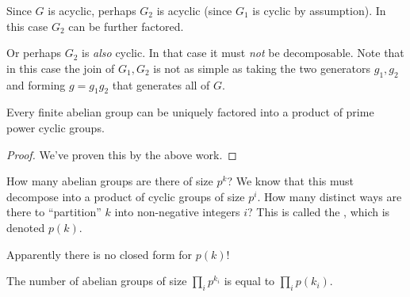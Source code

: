 \documentclass[11pt, oneside]{amsart}
\begin{document}
\begin{remark}
  Since $G$ is acyclic, perhaps $G_2$ is acyclic (since $G_1$ is cyclic
  by assumption). In this case $G_2$ can be further factored.

  Or perhaps $G_2$ is \emph{also} cyclic. In that case it must
  \emph{not} be decomposable. Note that in this case the join of $G_1,
  G_2$ is not as simple as taking the two generators $g_1, g_2$ and
  forming $g = g_1 g_2$ that generates all of $G$.
\end{remark}

\begin{theorem}

  Every finite abelian group can be uniquely factored into a product of
  prime power cyclic groups.
\end{theorem}

\begin{proof}
  We've proven this by the above work.
\end{proof}

\begin{remark}
  How many abelian groups are there of size $p^k$? We know that this
  must decompose into a product of cyclic groups of size $p^i$. How many
  distinct ways are there to ``partition'' $k$ into non-negative
  integers $i$? This is called the , which is
  denoted $p(k)$.

  Apparently there is no closed form for $p(k)$!
\end{remark}

\begin{remark}
  The number of abelian groups of size $\prod_i p^{k_i}$ is equal to
  $\prod_i p(k_i)$.
\end{remark}

\end{document}
